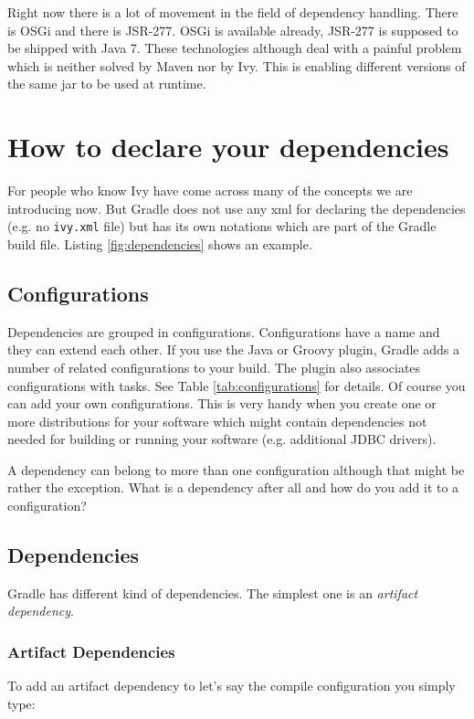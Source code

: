 Right now there is a lot of movement in the field of dependency handling. There is OSGi and there is JSR-277. OSGi is available already, JSR-277 is supposed to be shipped with Java 7. These technologies although deal with a painful problem which is neither solved by Maven nor by Ivy. This is enabling different versions of the same jar to be used at runtime.


\section{How to declare your dependencies} %
\label{sec:how_to_declare_your_dependencies}

For people who know Ivy have come across many of the concepts we are introducing now. But Gradle does not use any xml for declaring the dependencies (e.g. no \texttt{ivy.xml} file) but has its own notations which are part of the Gradle build file. Listing \ref{fig:dependencies} shows an example.

\subsection{Configurations} %
\label{sub:configurations}
Dependencies are grouped in configurations. Configurations have a name and they can extend each other. If you use the Java or Groovy plugin, Gradle adds a number of related configurations to your build. The plugin also associates configurations with tasks. See Table \ref{tab:configurations} for details. Of course you can add your own configurations. This is very handy when you create one or more distributions for your software which might contain dependencies not needed for building or running your software (e.g. additional JDBC drivers).

A dependency can belong to more than one configuration although that might be rather the exception. What is a dependency after all and how do you add it to a configuration? 

\subsection{Dependencies} %
\label{sub:dependencies}
Gradle has different kind of dependencies. The simplest one is an \emph{artifact dependency}.
\subsubsection{Artifact Dependencies} %
\label{ssub:artifact_dependencies}
To add an artifact dependency to let's say the compile configuration you simply type:

